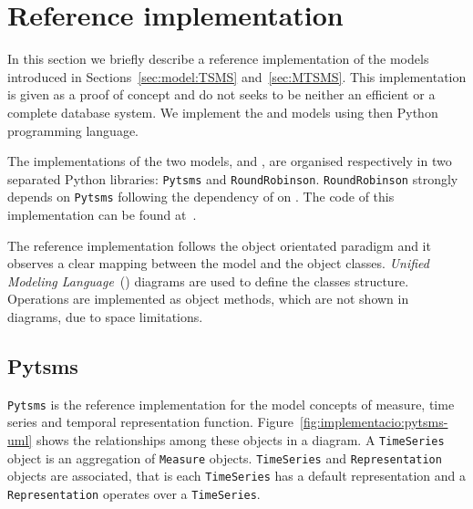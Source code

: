 \section{Reference implementation}
\label{sec:implementation}

In this section we briefly describe a reference implementation of the
models introduced in Sections~\ref{sec:model:TSMS}
and~\ref{sec:MTSMS}. This implementation is given as a proof of
concept and do not seeks to be neither an efficient or a complete database
system. We implement the  and  models using
then Python~\cite{python:doc2} programming language.

The implementations of the two models,  and ,
are organised respectively in two separated Python libraries:
\texttt{Pytsms} and \texttt{RoundRobinson}.  \texttt{RoundRobinson}
strongly depends on \texttt{Pytsms} following the dependency of
 on .  The code of this implementation can be
found at~\cite{llusa:roundrobinson}.

The reference implementation follows the object orientated paradigm
and it observes a clear mapping between the model and the object
classes. \emph{Unified Modeling Language}~() diagrams are used to
define the classes structure.  Operations are implemented as object
methods, which are not shown in  diagrams, due to space
limitations.


\subsection{Pytsms}

\texttt{Pytsms} is the reference implementation for the model concepts
of measure, time series and temporal representation function.
Figure~\ref{fig:implementacio:pytsms-uml} shows the relationships
among these objects in a  diagram. A \texttt{TimeSeries}
object is an aggregation of \texttt{Measure}
objects. \texttt{TimeSeries} and \texttt{Representation} objects are
associated, that is each \texttt{TimeSeries} has a default
representation and a \texttt{Representation} operates over a
\texttt{TimeSeries}.

